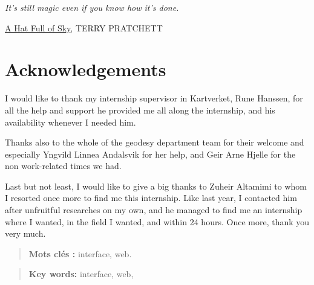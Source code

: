 \documentclass{themeensg}
\newlength\longest
\begin{document}
\clearpage

\thispagestyle{empty}
\null\vfill

\settowidth{}
\begin{center}
\parbox{\longest}{
  \raggedright{\huge\itshape
  It's still magic even if you know how it's done.\par\bigskip
  }
  \raggedleft\Large\underline{A Hat Full of Sky}\MakeUppercase{, Terry Pratchett}\par%
}
\end{center}
\vfill\vfill

\clearpage

\newevenpage
\chapter*{Acknowledgements}

I would like to thank my internship supervisor in Kartverket, Rune Hanssen, for all the help and support he provided me all along the internship, and his availability whenever I needed him.

Thanks also to the whole of the geodesy department team for their welcome and especially Yngvild Linnea Andalsvik for her help, and Geir Arne Hjelle for the non work-related times we had.

Last but not least, I would like to give a big thanks to Zuheir Altamimi to whom I resorted once more to find me this internship. Like last year, I contacted him after unfruitful researches on my own, and he managed to find me an internship where I wanted, in the field I wanted, and within 24 hours. Once more, thank you very much.

\begin{abstract}
\thispagestyle{empty}
	\vspace{1cm}

	
	
	\vspace{1.5cm}
	
	\textbf{Mots clés :} interface, web.
\end{abstract}


\begin{abstract}
\thispagestyle{empty}
	\vspace{1cm}
	
	
	\vspace{1.5cm}
	
	\textbf{Key words:} interface, web, 
\end{abstract}
\end{document}
